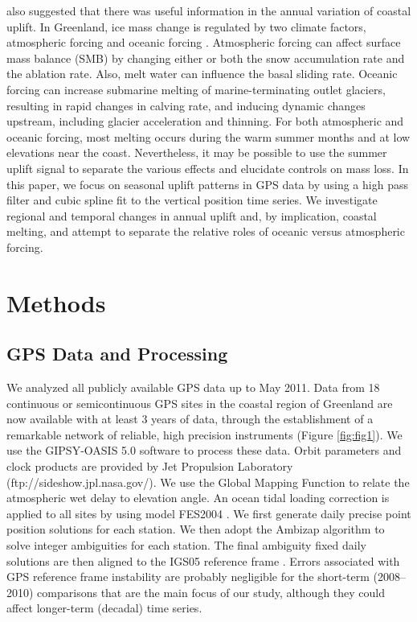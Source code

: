 \cite{jiang2010accelerating} also suggested that there was useful information in the annual variation of coastal
uplift. In Greenland, ice mass change is regulated by two climate factors, atmospheric forcing \cite[]{zwally2002surface,hall2008greenland} and oceanic forcing \cite[]{van2008large,holland2008acceleration,hanna2009hydrologic,straneo2010rapid,straneo2012characteristics,seale2011ocean}. Atmospheric forcing can affect surface mass balance (SMB) by changing either or both the snow accumulation rate and the ablation rate. Also, melt water can influence the basal sliding rate. Oceanic forcing can increase submarine melting of marine-terminating outlet glaciers, resulting in rapid changes in calving rate, and inducing dynamic changes upstream, including glacier acceleration and thinning. For both atmospheric and oceanic forcing, most melting occurs during the warm summer months and at low elevations near the coast. Nevertheless, it may be possible to use the
summer uplift signal to separate the various effects and elucidate controls on mass loss. In this paper, we focus on seasonal uplift patterns in GPS data by using a high pass filter and cubic spline fit to the vertical position time series. We investigate regional and temporal changes in annual uplift and, by implication, coastal melting, and attempt
to separate the relative roles of oceanic versus atmospheric forcing.   
 
\section{Methods}

\subsection{GPS Data and Processing}
We analyzed all publicly available GPS data
up to May 2011. Data from 18 continuous or
semicontinuous GPS sites in the coastal region of
Greenland are now available with at least 3 years of
data, through the establishment of a remarkable
network of reliable, high precision instruments \cite[]{bevis2012bedrock} (Figure \ref{fig:fig1}). We use the
GIPSY-OASIS 5.0 software \cite[]{zumberge1997precise} to process these data. Orbit parameters and
clock products are provided by Jet Propulsion
Laboratory (ftp://sideshow.jpl.nasa.gov/). We use
the Global Mapping Function \cite[]{bohm2006global}
to relate the atmospheric wet delay to elevation
angle. An ocean tidal loading correction is applied
to all sites by using model FES2004 \cite[]{letellier2005etude}. We first generate daily precise point position
solutions for each station. We then adopt the
Ambizap algorithm \cite[]{blewitt2008fixed} to solve integer
ambiguities for each station. The final ambiguity fixed
daily solutions are then aligned to the IGS05
reference frame \cite[]{altamimi2007itrf2005}. Errors
associated with GPS reference frame instability are
probably negligible for the short-term (2008–2010)
comparisons that are the main focus of our study,
although they could affect longer-term (decadal)
time series. 

